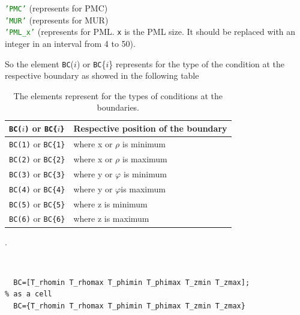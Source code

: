 \begin{myindentpar}
\begin{myindentpar}
\begin{myindentpar}
	     \textcolor{green}{\texttt{'PMC'}} \qquad   (represents for PMC)\\
	     \textcolor{green}{\texttt{'MUR'}}  \qquad  (represents for MUR)\\
	     \textcolor{green}{\texttt{'PML\_x'}} \qquad   (represents for PML. \texttt{x} is  the PML size. It should be replaced with an integer in an interval from 4 to 50).
	  \end{myindentpar}	
	\end{myindentpar}	
	  So the element \texttt{BC}($i$) or \texttt{BC}\{$i$\} represents for the type of the  condition at the respective boundary as showed in the following table
	  \begin{table}[htb]\centering
	  \begin{tabular}{l|l}
	  \texttt{BC($i$)} or \texttt{BC\{$i$\}} & Respective position of the boundary\\ \hline
		 \texttt{BC(1)} or  \texttt{BC\{1\}} & where x or $\rho$ is minimum\\
		 \texttt{BC(2)} or  \texttt{BC\{2\}}& where x or $\rho$ is maximum\\
		 \texttt{BC(3)} or  \texttt{BC\{3\}}& where y or $\varphi$ is minimum\\
		 \texttt{BC(4)} or  \texttt{BC\{4\}}& where y or $\varphi$is maximum\\
		 \texttt{BC(5)} or  \texttt{BC\{5\}}& where z is minimum\\
		 \texttt{BC(6)} or  \texttt{BC\{6\}}& where z is maximum
	  \end{tabular}\caption{The elements represent for the types of conditions at the boundaries.}
	  \end{table}
	  \label{Elements of BC and the rescpective boundaries}.
         \end{myindentpar}
	 \\
         \begin{lstlisting}[caption={\texttt{BC} in a cylindrical coordinate},label={ListingCylinBC}]
% as a vector
  BC=[T_rhomin T_rhomax T_phimin T_phimax T_zmin T_zmax];
% as a cell
  BC={T_rhomin T_rhomax T_phimin T_phimax T_zmin T_zmax}
	  \end{lstlisting}%
